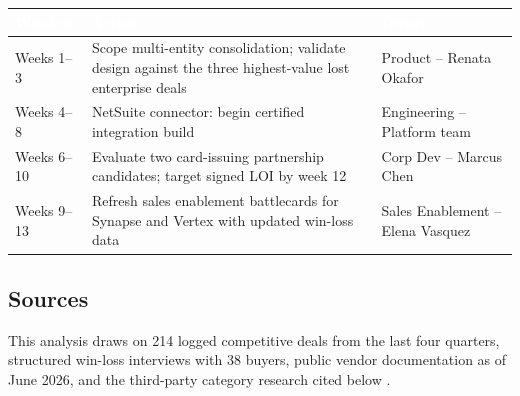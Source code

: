 \begin{center}
\footnotesize
\begin{tabularx}{\linewidth}{@{} p{2.6cm} Y p{2.6cm} @{}}
\toprule
{}
\textcolor{white}{\textbf{Window}} & \textcolor{white}{\textbf{Action}} & \textcolor{white}{\textbf{Owner}} \\
\midrule
Weeks 1--3   & Scope multi-entity consolidation; validate design against the three highest-value lost enterprise deals & Product -- Renata Okafor \\
Weeks 4--8   & NetSuite connector: begin certified integration build & Engineering -- Platform team \\
Weeks 6--10  & Evaluate two card-issuing partnership candidates; target signed LOI by week 12 & Corp Dev -- Marcus Chen \\
Weeks 9--13  & Refresh sales enablement battlecards for Synapse and Vertex with updated win-loss data & Sales Enablement -- Elena Vasquez \\
\bottomrule
\end{tabularx}
\end{center}

\subsection{Sources}

This analysis draws on 214 logged competitive deals from the last four quarters, structured
win-loss interviews with 38 buyers, public vendor documentation as of June 2026, and the
third-party category research cited below \cite{cedarpoint2026sizing,almanac2026procurement,northbridge2026winloss}.
